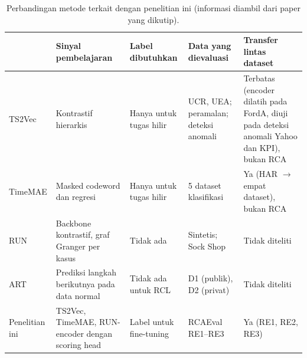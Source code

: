 \begin{table}
\caption{Perbandingan metode terkait dengan penelitian ini (informasi diambil dari paper yang dikutip).}\label{tab:related}
\centering
\scriptsize
\setlength{\tabcolsep}{2.5pt}
\begin{tabular}{p{1.5cm}p{2.0cm}p{2.0cm}p{2.9cm}p{2.0cm}}
\toprule
 & Sinyal pembelajaran & Label dibutuhkan & Data yang dievaluasi & Transfer lintas dataset\\
\midrule
TS2Vec \cite{yue2022ts2vec} & Kontrastif hierarkis & Hanya untuk tugas hilir & UCR, UEA; peramalan; deteksi anomali & Terbatas (encoder dilatih pada FordA, diuji pada deteksi anomali Yahoo dan KPI), bukan RCA\\
TimeMAE \cite{cheng2026timemae} & Masked codeword dan regresi & Hanya untuk tugas hilir & 5 dataset klasifikasi & Ya (HAR $\rightarrow$ empat dataset), bukan RCA\\
RUN \cite{lin2024run} & Backbone kontrastif, graf Granger per kasus & Tidak ada & Sintetis; Sock Shop & Tidak diteliti\\
ART \cite{sun2024art} & Prediksi langkah berikutnya pada data normal & Tidak ada untuk RCL & D1 (publik), D2 (privat) & Tidak diteliti\\
Penelitian ini & TS2Vec, TimeMAE, RUN-encoder dengan scoring head & Label untuk fine-tuning & RCAEval RE1--RE3 & Ya (RE1, RE2, RE3)\\
\bottomrule
\end{tabular}
\end{table}
